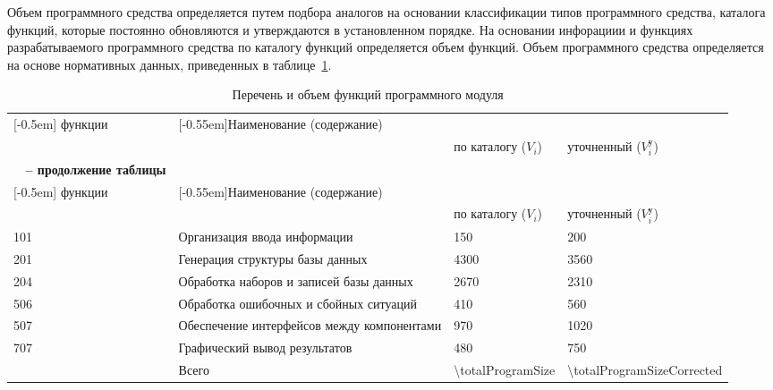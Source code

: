 Объем программного средства определяется путем подбора аналогов на основании классификации типов программного средства, каталога функций, которые постоянно обновляются и утверждаются в установленном порядке. На основании инфорациии и функциях разрабатываемого программного средства по каталогу функций определяется объем функций. Объем программного средства определяется на основе нормативных данных, приведенных в таблице~\ref{table:econ:volume_of_po}.

\begin{longtable}{| >{\raggedright}m{}
                  | >{\centering}m{}
                  | >{\centering}m{}
                  | >{\centering\arraybackslash}m{}|}
\caption{Перечень и объем функций программного модуля}
\label{table:econ:volume_of_po} \\

\hline
       \multirow{2}{0.12\textwidth}[-0.5em]{\centering \No{} функции}
     & \multirow{2}{0.40\textwidth}[-0.55em]{\centering Наименование (содержание)}
     & \multicolumn{2}{c|}{\centering Объем функции, LoC} \tabularnewline
\cline{3-4} &
     & { по каталогу ($ V_{i} $) }
     & { уточненный ($ V_{i}^{\text{у}} $) } \tabularnewline
\endfirsthead

\multicolumn{3}{l}%
{{\bfseries \tablename\ \thetable{} -- продолжение таблицы}} \\
\hline
       \multirow{2}{0.12\textwidth}[-0.5em]{\centering \No{} функции}
     & \multirow{2}{0.40\textwidth}[-0.55em]{\centering Наименование (содержание)}
     & \multicolumn{2}{c|}{\centering Объем функции, LoC} \tabularnewline
\cline{3-4} &
     & { по каталогу ($ V_{i} $) }
     & { уточненный ($ V_{i}^{\text{у}} $) } \tabularnewline
\endhead

\hline
101 & Организация ввода информации & \num{150} & \num{200} \tabularnewline
\hline
201 & Генерация структуры базы данных & \num{4300} & \num{3560} \tabularnewline
\hline
204 & Обработка наборов и записей базы данных & \num{2670} & \num{2310} \tabularnewline
\hline
506 & Обработка ошибочных и сбойных ситуаций & \num{410} & \num{560} \tabularnewline
\hline
507 & Обеспечение интерфейсов между компонентами & \num{970} & \num{1020} \tabularnewline
\hline
707 & Графический вывод результатов & \num{480} & \num{750} \tabularnewline
\hline
& Всего & \num{\totalProgramSize} & \num{\totalProgramSizeCorrected} \tabularnewline
\hline
\end{longtable}

